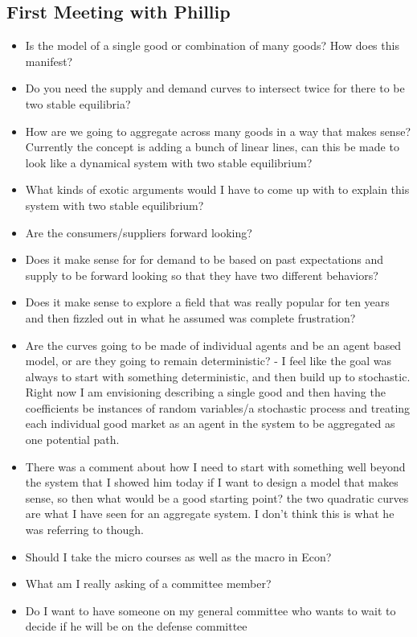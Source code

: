 \documentclass{article}
\begin{document}
\subsection{First Meeting with Phillip}
\begin{itemize}
	\item Is the model of a single good or combination of many goods? How does this manifest?
	\item Do you need the supply and demand curves to intersect twice for there to be two stable equilibria?
	\item How are we going to aggregate across many goods in a way that makes sense? Currently the concept is adding a bunch of linear lines, can this be made to look like a dynamical system with two stable equilibrium?
	\item What kinds of exotic arguments would I have to come up with to explain this system with two stable equilibrium?
	\item Are the consumers/suppliers forward looking?
	\item Does it make sense for for demand to be based on past expectations and supply to be forward looking so that they have two different behaviors?
	\item Does it make sense to explore a field that was really popular for ten years and then fizzled out in what he assumed was complete frustration?
	\item Are the curves going to be made of individual agents and be an agent based model, or are they going to remain deterministic? - I feel like the goal was always to start with something deterministic, and then build up to stochastic. Right now I am envisioning describing a single good and then having the coefficients be instances of random variables/a stochastic process and treating each individual good market as an agent in the system to be aggregated as one potential path.
	\item There was a comment about how I need to start with something well beyond the system that I showed him today if I want to design a model that makes sense, so then what would be a good starting point? the two quadratic curves are what I have seen for an aggregate system. I don't think this is what he was referring to though.
	\item Should I take the micro courses as well as the macro in Econ?
	\item What am I really asking of a committee member?
	\item Do I want to have someone on my general committee who wants to wait to decide if he will be on the defense committee
\end{itemize}
\end{document}
